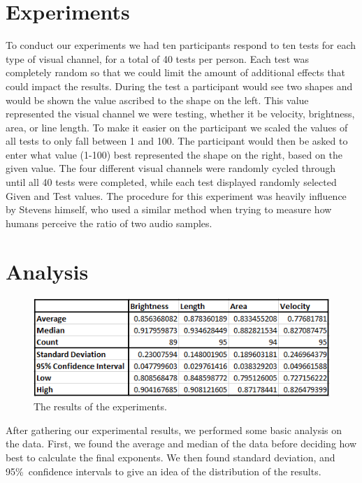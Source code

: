 \documentclass{article}
\begin{document}
\begin{multicols}{2}
\section{Experiments}
To conduct our experiments we had ten participants respond to ten tests for each type of visual channel, for a total of 40 tests per person. Each test was completely random so that we could limit the amount of additional effects that could impact the results. \cite{heer2010crowdsourcing} During the test a participant would see two shapes and would be shown the value ascribed to the shape on the left. This value represented the visual channel we were testing, whether it be velocity, brightness, area, or line length. To make it easier on the participant we scaled the values of all tests to only fall between 1 and 100. The participant would then be asked to enter what value (1-100) best represented the shape on the right, based on the given value. The four different visual channels were randomly cycled through until all 40 tests were completed, while each test displayed randomly selected Given and Test values. The procedure for this experiment was heavily influence by Stevens himself, who used a similar method when trying to measure how humans perceive the ratio of two audio samples. \citep{stevens1956direct}
\section{Analysis}
\begin{figure}[H]
    \centering
    \includegraphics[width=\columnwidth]{Table}
    \caption{The results of the experiments.}
    \label{fig:Table}
\end{figure}

After gathering our experimental results, we performed some basic analysis on the data. First, we found the average and median of the data before deciding how best to calculate the final exponents. We then found standard deviation, and 95\%\ confidence intervals to give an idea of the distribution of the results. \cite{stevens1964concerning}\cite{teghtsoonian1971exponents}\par


\end{multicols}
\end{document}
